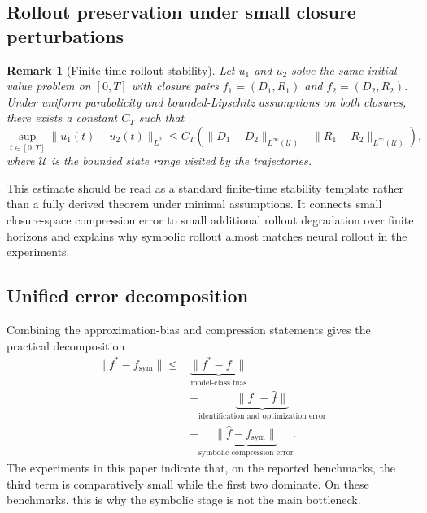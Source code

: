 \documentclass[preprint,12pt]{elsarticle}
\newtheorem{remark}{Remark}
\begin{document}
\subsection{Rollout preservation under small closure perturbations}

\begin{remark}[Finite-time rollout stability]
Let $u_1$ and $u_2$ solve the same initial-value problem on $[0,T]$ with closure pairs $f_1=(D_1,R_1)$ and $f_2=(D_2,R_2)$. Under uniform parabolicity and bounded-Lipschitz assumptions on both closures, there exists a constant $C_T$ such that
\begin{equation}
\sup_{t \in [0,T]} \|u_1(t) - u_2(t)\|_{L^2}
\le
C_T \left(
\|D_1-D_2\|_{L^\infty(\mathcal{U})} + \|R_1-R_2\|_{L^\infty(\mathcal{U})}
\right),
\end{equation}
where $\mathcal{U}$ is the bounded state range visited by the trajectories.
\end{remark}

This estimate should be read as a standard finite-time stability template rather than a fully derived theorem under minimal assumptions. It connects small closure-space compression error to small additional rollout degradation over finite horizons and explains why symbolic rollout almost matches neural rollout in the experiments.

\subsection{Unified error decomposition}

Combining the approximation-bias and compression statements gives the practical decomposition
\begin{equation}
\begin{aligned}
\|f^\ast - f_{\text{sym}}\|
\le {} &
\underbrace{\|f^\ast - f^\dagger\|}_{\text{model-class bias}}
\\
&+
\underbrace{\|f^\dagger - \widehat{f}\|}_{\text{identification and optimization error}}
\\
&+
\underbrace{\|\widehat{f} - f_{\text{sym}}\|}_{\text{symbolic compression error}}.
\end{aligned}
\label{eq:total_decomposition}
\end{equation}
The experiments in this paper indicate that, on the reported benchmarks, the third term is comparatively small while the first two dominate. On these benchmarks, this is why the symbolic stage is not the main bottleneck.
\end{document}
